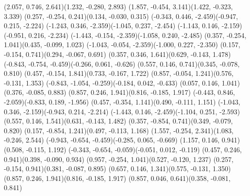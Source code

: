 \pstThreeDLine[linecolor=gray](2.057, 0.746, 2.641)(1.232, -0.280, 2.893)
\pstThreeDLine[linecolor=gray](1.857, -0.454, 3.141)(1.422, -0.323, 3.339)
\pstThreeDLine[linecolor=gray](0.257, -0.254, 0.241)(0.134, -0.030, 0.315)
\pstThreeDLine[linecolor=gray](-0.343, 0.446, -2.459)(-0.947, 0.215, -2.224)
\pstThreeDLine[linecolor=gray](-1.243, 0.346, -2.359)(-1.045, 0.237, -2.454)
\pstThreeDLine[linecolor=gray](-1.143, 0.146, -2.159)(-0.951, 0.216, -2.234)
\pstThreeDLine[linecolor=gray](-1.443, -0.154, -2.359)(-1.058, 0.240, -2.485)
\pstThreeDLine[linecolor=gray](0.357, -0.254, 1.041)(0.435, -0.099, 1.023)
\pstThreeDLine[linecolor=gray](-1.043, -0.054, -2.359)(-1.000, 0.227, -2.350)
\pstThreeDLine[linecolor=gray](0.157, -0.154, 0.741)(0.294, -0.067, 0.691)
\pstThreeDLine[linecolor=gray](0.357, 0.346, 1.641)(0.629, -0.143, 1.478)
\pstThreeDLine[linecolor=gray](-0.843, -0.754, -0.459)(-0.266, 0.061, -0.626)
\pstThreeDLine[linecolor=gray](0.557, 0.146, 0.741)(0.345, -0.078, 0.810)
\pstThreeDLine[linecolor=gray](0.457, -0.154, 1.841)(0.733, -0.167, 1.722)
\pstThreeDLine[linecolor=gray](0.857, -0.054, 1.241)(0.576, -0.131, 1.353)
\pstThreeDLine[linecolor=gray](-0.843, -1.054, -0.259)(-0.184, 0.042, -0.433)
\pstThreeDLine[linecolor=gray](0.057, 0.146, 1.041)(0.376, -0.085, 0.883)
\pstThreeDLine[linecolor=gray](0.857, 0.246, 1.941)(0.816, -0.185, 1.917)
\pstThreeDLine[linecolor=gray](-0.443, 0.846, -2.059)(-0.833, 0.189, -1.956)
\pstThreeDLine[linecolor=gray](0.457, -0.354, 1.141)(0.490, -0.111, 1.151)
\pstThreeDLine[linecolor=gray](-1.043, 0.346, -2.159)(-0.943, 0.214, -2.214)
\pstThreeDLine[linecolor=gray](-1.443, 0.146, -2.459)(-1.104, 0.251, -2.593)
\pstThreeDLine[linecolor=gray](0.557, 0.146, 1.541)(0.631, -0.143, 1.482)
\pstThreeDLine[linecolor=gray](0.357, -0.854, 0.741)(0.349, -0.079, 0.820)
\pstThreeDLine[linecolor=gray](0.157, -0.854, 1.241)(0.497, -0.113, 1.168)
\pstThreeDLine[linecolor=gray](1.557, -0.254, 2.341)(1.083, -0.246, 2.544)
\pstThreeDLine[linecolor=gray](-0.943, -0.654, -0.459)(-0.285, 0.065, -0.669)
\pstThreeDLine[linecolor=gray](1.157, 0.146, 0.941)(0.508, -0.115, 1.192)
\pstThreeDLine[linecolor=gray](-0.343, -0.654, -0.059)(-0.051, 0.012, -0.119)
\pstThreeDLine[linecolor=gray](0.457, 0.246, 0.941)(0.398, -0.090, 0.934)
\pstThreeDLine[linecolor=gray](0.957, -0.254, 1.041)(0.527, -0.120, 1.237)
\pstThreeDLine[linecolor=gray](0.257, -0.154, 0.941)(0.381, -0.087, 0.895)
\pstThreeDLine[linecolor=gray](0.657, 0.146, 1.341)(0.575, -0.131, 1.350)
\pstThreeDLine[linecolor=gray](0.857, 0.246, 1.941)(0.816, -0.185, 1.917)
\pstThreeDLine[linecolor=gray](0.857, 0.046, 0.641)(0.358, -0.081, 0.841)
